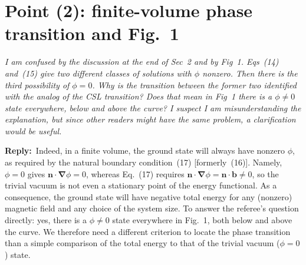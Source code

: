 \documentclass[11pt,a4paper]{article}
\newcommand{\vek}[1]{\bm{#1}}
\newcommand{\grad}{\vek\nabla}
\newenvironment{referee}{\par\medskip\noindent\color{black!70}\itshape}{\par\medskip}
\newcommand{\reply}{\noindent\textbf{Reply:}\ }
\begin{document}
\section*{Point (2): finite-volume phase transition and Fig.~1}

\begin{referee}
I am confused by the discussion at the end of Sec~2 and by Fig~1. Eqs~(14) and~(15) give two different classes of solutions with $\phi$ nonzero. Then there is the third possibility of $\phi=0$. Why is the transition between the former two identified with the analog of the CSL transition? Does that mean in Fig~1 there is a $\phi\neq0$ state everywhere, below and above the curve? I suspect I am misunderstanding the explanation, but since other readers might have the same problem, a clarification would be useful.
\end{referee}

\reply Indeed, in a finite volume, the ground state will always have nonzero $\phi$, as required by the natural boundary condition~(17) [formerly~(16)]. Namely, $\phi=0$ gives $\vek n\cdot\grad\phi=0$, whereas Eq.~(17) requires $\vek n\cdot\grad\phi=\vek n\cdot\vek b\neq0$, so the trivial vacuum is not even a stationary point of the energy functional. As a consequence, the ground state will have negative total energy for any (nonzero) magnetic field and any choice of the system size. To answer the referee's question directly: yes, there is a $\phi\neq0$ state everywhere in Fig.~1, both below and above the curve. We therefore need a different criterion to locate the phase transition than a simple comparison of the total energy to that of the trivial vacuum ($\phi=0$) state.
\end{document}
